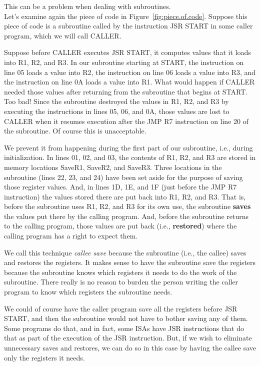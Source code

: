 \documentclass{patt}
\begin{document}
This can be a problem when dealing with subroutines.
\\
Let's examine again the piece of code in Figure~\ref{fig:piece.of.code}.
Suppose this piece of code is a subroutine called by the instruction JSR START 
in some caller program, which we will call CALLER.  

Suppose before CALLER executes JSR START, it computes values that it loads 
into R1, R2, and R3.  In our subroutine starting at START, the instruction 
on line 05 loads a value into R2, the instruction on line 06 loads a value 
into R3, and the instruction on line 0A loads a value into R1.  What would
happen if CALLER needed those values after returning from the subroutine that 
begins at START.  Too bad!  Since the subroutine destroyed the values in 
R1, R2, and R3 by executing the instructions in lines 05, 06, and 0A, those 
values are lost to CALLER  when it resumes execution after the JMP R7 
instruction on line 20 of the subroutine.  Of course this is unacceptable.  

We prevent it from happening during the first part of our subroutine, i.e.,
during initialization.  In lines 01, 02, and 03, the contents of
R1, R2, and R3 are stored in memory locations SaveR1, SaveR2, and SaveR3.
Three locations in the subroutine (lines 22, 23, and 24) have been set aside
for the purpose of saving those register values.
And, in lines 1D, 1E, and 1F (just before the JMP R7 instruction) the values
stored there are put back into R1, R2, and R3.  That is, 
before the subroutine uses R1, R2,
and R3 for its own use, the subroutine {\bf saves} the values put there by the
calling program.  And, before the subroutine returns to the calling program,
those values are put back (i.e., {\bf restored}) where the calling program 
has a right to expect them.
 
We call this technique {\em callee save} because the subroutine (i.e., the
callee) saves and restores the registers.  It makes sense to have the 
subroutine save the registers because the subroutine knows which registers it
needs to do the work of the subroutine.  There really is no reason to
burden the person writing the caller program to know which registers the
subroutine needs.  

We could of course have the caller program save all the registers before
JSR START, and then the subroutine would not have to bother saving any of them.
Some programs do that, and in fact, some ISAs have JSR instructions that do
that as part of the execution of the JSR instruction.  But, if we wish to
eliminate unnecessary saves and restores, we can do so in this case by having
the callee save only the registers it needs.
\end{document}
